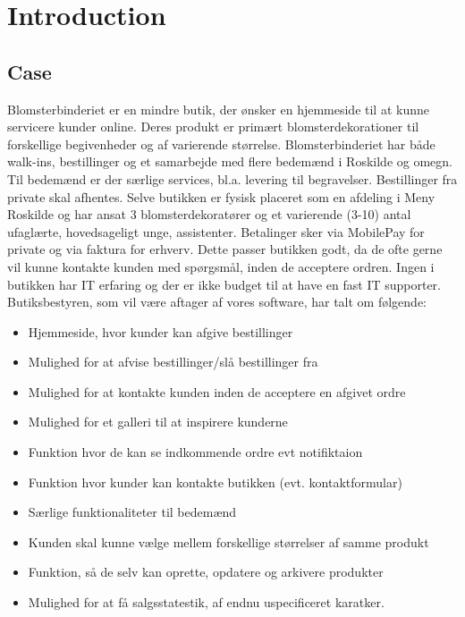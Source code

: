 \chapter{Introduction}
\label{chapter:introduction}

\section{Case}
Blomsterbinderiet er en mindre butik, der ønsker en hjemmeside til at kunne servicere kunder online.
Deres produkt er primært blomsterdekorationer til forskellige begivenheder og af varierende størrelse.
Blomsterbinderiet har både walk-ins, bestillinger og et samarbejde med flere bedemænd i Roskilde og omegn. Til bedemænd er der særlige services, bl.a. levering til begravelser. Bestillinger fra private skal afhentes.
Selve butikken er fysisk placeret som en afdeling i Meny Roskilde og har ansat 3 blomsterdekoratører og et varierende (3-10) antal ufaglærte, hovedsageligt unge, assistenter.
Betalinger sker via MobilePay for private og via faktura for erhverv. Dette passer butikken godt, da de ofte gerne vil kunne kontakte kunden med spørgsmål, inden de acceptere ordren.
Ingen i butikken har IT erfaring og der er ikke budget til at have en fast IT supporter. Butiksbestyren, som vil være aftager af vores software, har talt om følgende:
\begin{itemize}
	\item Hjemmeside, hvor kunder kan afgive bestillinger
	\item Mulighed for at afvise bestillinger/slå bestillinger fra
	\item Mulighed for at kontakte kunden inden de acceptere en afgivet ordre
	\item Mulighed for et galleri til at inspirere kunderne
	\item Funktion hvor de kan se indkommende ordre evt notifiktaion
	\item Funktion hvor kunder kan kontakte butikken (evt. kontaktformular)
	\item Særlige funktionaliteter til bedemænd
	\item Kunden skal kunne vælge mellem forskellige størrelser af samme produkt
	\item Funktion, så de selv kan oprette, opdatere og arkivere produkter
	\item Mulighed for at få salgsstatestik, af endnu uspecificeret karatker.
	\label{list:butikkens-ønsker}
\end{itemize}

